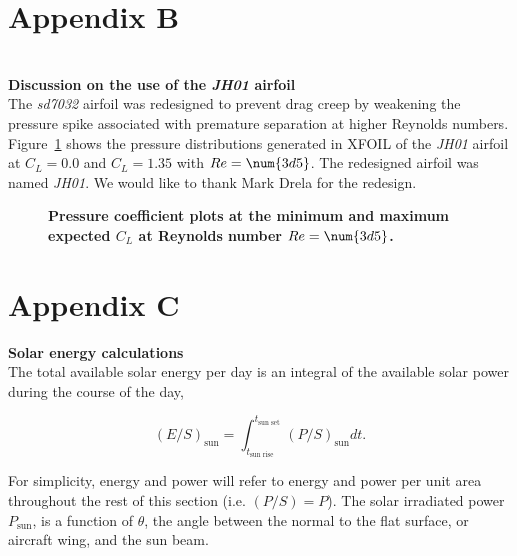 \section*{Appendix B} \\

\textbf{Discussion on the use of the \emph{JH01} airfoil} \\

The \emph{sd7032} airfoil was redesigned to prevent drag creep by weakening the pressure spike associated with premature separation at higher Reynolds numbers.  
Figure~\ref{f:jhcps} shows the pressure distributions generated in XFOIL of the \emph{JH01} airfoil at $C_L=0.0$ and $C_L=1.35$ with $Re=\num{3d5}$.
The redesigned airfoil was named \emph{JH01}. We would like to thank Mark Drela for the redesign.

\begin{figure}[H]
 \begin{subfigmatrix}{2}%
 \end{subfigmatrix}
 \caption{\textbf{Pressure coefficient plots at the minimum and maximum expected $C_L$ at Reynolds number $Re=\num{3d5}$.}}
 \label{f:jhcps}
\end{figure}

\section*{Appendix C}

\textbf{Solar energy calculations} \\

The total available solar energy per day is an integral of the available solar power during the course of the day,

    \begin{equation}
        \label{e:solares}
        (E/S)_{\text{sun}} = \int_{t_{\text{sun rise}}}^{t_{\text{sun set}}} (P/S)_{\text{sun}} dt.
    \end{equation}
    
For simplicity, energy and power will refer to energy and power per unit area throughout the rest of this section (i.e. $(P/S) = P$). 
The solar irradiated power $P_{\text{sun}}$, is a function of $\theta$, the angle between the normal to the flat surface, or aircraft wing, and the sun beam.\cite{solar}

